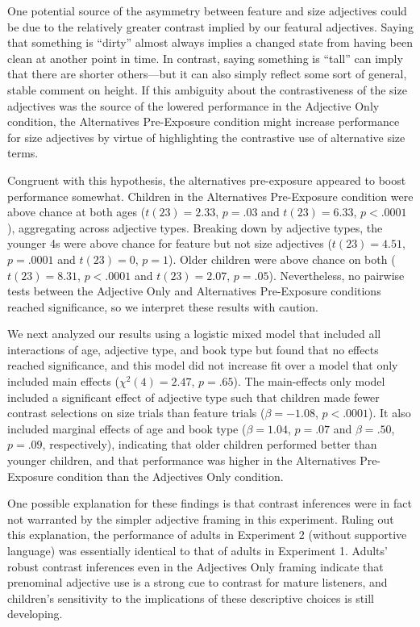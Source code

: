 \documentclass[man]{apa2}
\begin{document}
One potential source of the asymmetry between feature and size adjectives could be due to the relatively greater contrast implied by our featural adjectives. Saying that something is ``dirty'' almost always implies a changed state from having been clean at another point in time. In contrast, saying something is ``tall'' can imply that there are shorter others---but it can also simply reflect some sort of general, stable comment on height. If this ambiguity about the contrastiveness of the size adjectives was the source of the lowered performance in the Adjective Only condition, the Alternatives Pre-Exposure condition might increase performance for size adjectives by virtue of highlighting the contrastive use of alternative size terms. 

Congruent with this hypothesis, the alternatives pre-exposure appeared to boost performance somewhat. Children in the Alternatives Pre-Exposure condition were above chance at both ages ($t(23) = 2.33$, $p = .03$ and $t(23) = 6.33$, $p < .0001$), aggregating across adjective types. Breaking down by adjective types, the younger 4s were above chance for feature but not size adjectives ($t(23) = 4.51$, $p = .0001$ and $t(23)=0$, $p = 1$). Older children were above chance on both ($t(23) = 8.31$, $p < .0001$ and $t(23)= 2.07$, $p = .05$). Nevertheless, no pairwise tests between the Adjective Only and Alternatives Pre-Exposure conditions reached significance, so we interpret these results with caution. 

We next analyzed our results using a logistic mixed model that included all interactions of age, adjective type, and book type but found that no effects reached significance, and this model did not increase fit over a model that only included main effects ($\chi^2(4) = 2.47$, $p = .65$). The main-effects only model included a significant effect of adjective type such that children made fewer contrast selections on size trials than feature trials ($\beta = -1.08$, $p < .0001$). It also included marginal effects of age and book type ($\beta = 1.04$, $p = .07$ and $\beta = .50$, $p = .09$, respectively), indicating that older children performed better than younger children, and that performance was higher in the Alternatives Pre-Exposure condition than the Adjectives Only condition. 


One possible explanation for these findings is that contrast inferences were in fact not warranted by the simpler adjective framing in this experiment. Ruling out this explanation, the performance of adults in Experiment 2 (without supportive language) was essentially identical to that of adults in Experiment 1. Adults' robust contrast inferences even in the Adjectives Only framing indicate that prenominal adjective use is a strong cue to contrast for mature listeners, and children's sensitivity to the implications of these descriptive choices is still developing.
\end{document}
